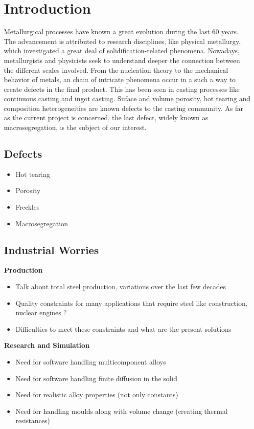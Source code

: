 \chapter*{Introduction}


Metallurgical processes have known a great evolution during the last 60 years. The advancement is attributed to 
research disciplines, like physical metallurgy, which investigated a great deal of solidification-related phenomena.
Nowadays, metallurgists and physicists seek to understand deeper the connection between the different scales involved.
From the nucleation theory to the mechanical behavior of metals, an chain of intricate phenomena occur in a such a way
to create defects in the final product. This has been seen in casting processes like continuous casting and ingot
casting. Suface and volume porosity, hot tearing and composition heterogeneities are known defects to the casting community.
As far as the current project is concerned, the last defect, widely known as macrosegregation, is the subject of our interest.

\section*{Defects}
\begin{itemize}
\item Hot tearing
\item Porosity
\item Freckles
\item Macrosegregation
\end{itemize}

\section*{Industrial Worries}
\textbf{Production}
\begin{itemize}
\item Talk about total steel production, variations over the last few decades
\item Quality constraints for many applications that require steel like construction, nuclear engines ? 
\item Difficulties to meet these constraints and what are the present solutions
\end{itemize}
\textbf{Research and Simulation}
\begin{itemize}
\item Need for software handling multicomponent alloys
\item Need for software handling finite diffusion in the solid
\item Need for realistic alloy properties (not only constants)
\item Need for handling moulds along with volume change (creating thermal resistances)
\end{itemize}


